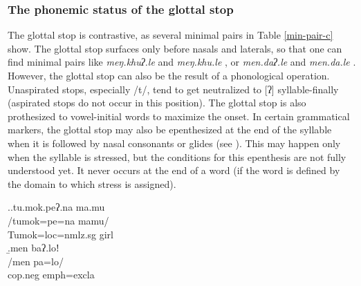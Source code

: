 \subsubsection{The phonemic status of the glottal stop}

The glottal stop is contrastive, as several minimal pairs in Table \ref{min-pair-c}  show. The glottal stop surfaces only before nasals and laterals, so that one can find minimal pairs like  \emph{meŋ.khuʔ.le}  and \emph{meŋ.khu.le} , or \emph{men.daʔ.le}  and \emph{men.da.le} . However, the glottal stop can also be the result of a phonological operation. Unaspirated stops, especially /t/, tend to get neutralized to [ʔ] syllable-finally (aspirated stops do not occur in this position). The glottal stop is also prothesized to vowel-initial words to maximize the onset. In certain grammatical markers, the glottal stop may also  be epenthesized at the end of the syllable when it is followed by  nasal consonants or glides  (see \Next). This may happen only when the syllable is stressed, but the conditions for this epenthesis are not fully understood yet. It never occurs at the end of a word (if the word is defined by the domain to which stress is assigned). 

\ex.\a.\glll tu.mok.peʔ.na ma.mu\\
/tumok=pe=na mamu/\\
Tumok{\sc =loc=nmlz.sg} girl\\
\b.\glll men baʔ.loǃ\\
/men pa=lo/\\
{\sc cop.neg} {\sc emph=excla}\\


